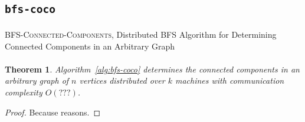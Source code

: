 \documentclass[11pt,epsf]{article}
\newtheorem{theorem}{Theorem}
\newcommand{\TODO}[0]{\textbf{\color{red}{TODO}}}
\begin{document}
{{    \paragraph{}{
      \TODO
    }
  }

  \subsection{\texttt{bfs-coco}}{
    \paragraph{}{
      \begin{algorithm}
        \footnotesize
        \caption{\textsc{BFS-Connected-Components}, Distributed BFS Algorithm for Determining Connected Components in an Arbitrary Graph}
        \label{alg:bfs-coco}
        \begin{algorithmic}
          \STATE{\TODO}
        \end{algorithmic}
      \end{algorithm}
    }
    \paragraph{}{
      \TODO
    }

    \begin{theorem}
      \label{thm:bfs-coco}
      Algorithm~\ref{alg:bfs-coco} determines the connected components in an arbitrary graph
      of $n$ vertices distributed over $k$ machines with communication complexity $O(???)$.
    \end{theorem}
    \begin{proof}
      Because reasons.
    \end{proof}
  }
}
\end{document}
